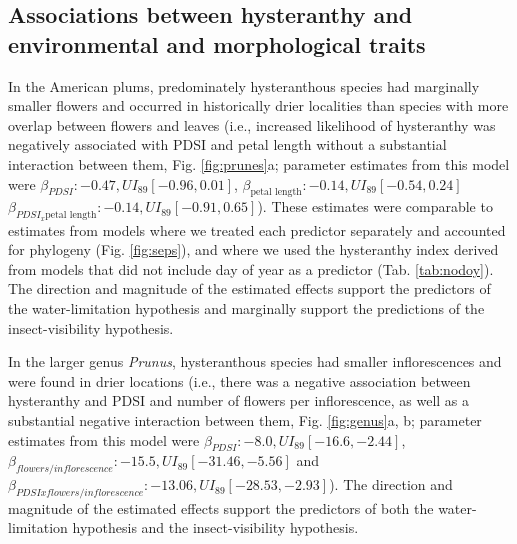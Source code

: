 \documentclass{article}[12pt]
\begin{document}
{\subsection*{Associations between hysteranthy and environmental and morphological traits}
In the American plums, predominately hysteranthous species had marginally smaller flowers and occurred in historically drier localities than species with more overlap between flowers and leaves (i.e., increased likelihood of hysteranthy was negatively associated with PDSI and petal length without a substantial interaction between them, Fig. \ref{fig:prunes}a; parameter estimates from this model were  $\beta_{PDSI}: -0.47, UI_{89}[-0.96, 0.01]$, $\beta_{\text{petal length}}: -0.14,UI_{89}[ -0.54, 0.24]$  $\beta_{PDSI_x \text{petal length}}: -0.14,UI_{89}[-0.91, 0.65]$). These estimates were comparable to estimates from models where we treated each predictor separately and accounted for phylogeny (Fig. \ref{fig:seps}), and where we used the hysteranthy index derived from models that did not include day of year as a predictor (Tab. \ref{tab:nodoy}). The direction and magnitude of the estimated effects support the predictors of the water-limitation hypothesis and marginally support the predictions of the insect-visibility hypothesis.
%

In the larger genus \emph{Prunus}, hysteranthous species had smaller inflorescences and were found in drier locations (i.e., there was a negative association between hysteranthy and PDSI and number of flowers per inflorescence, as well as a substantial negative interaction between them, Fig. \ref{fig:genus}a, b; parameter estimates from this model were  $\beta_{PDSI}:-8.0, UI_{89}[-16.6,-2.44]$,  $\beta_{flowers/inflorescence}: -15.5, UI_{89}[-31.46,-5.56]$ and $\beta_{PDSI x flowers/inflorescence}: -13.06, UI_{89}[-28.53,-2.93]$).  The direction and magnitude of the estimated effects support the predictors of both the water-limitation hypothesis and the insect-visibility hypothesis.

}
\end{document}
